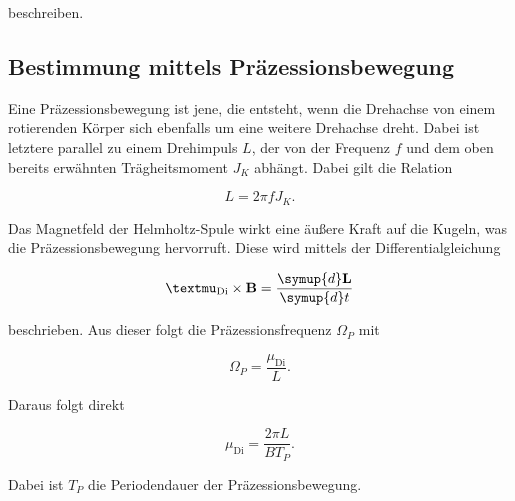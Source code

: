 beschreiben.


\subsection{Bestimmung mittels Präzessionsbewegung}

Eine Präzessionsbewegung ist jene, die entsteht, wenn die Drehachse von einem rotierenden Körper sich ebenfalls um eine weitere Drehachse dreht. 
Dabei ist letztere parallel zu einem Drehimpuls $L$, der von der Frequenz $f$ und dem oben bereits erwähnten Trägheitsmoment $J_K$ abhängt. Dabei gilt die Relation

\begin{equation}
    \label{eqn:drehimpuls}
    L = 2 \pi f J_K.
\end{equation}

Das Magnetfeld der Helmholtz-Spule wirkt eine äußere Kraft auf die Kugeln, was die Präzessionsbewegung hervorruft. Diese wird mittels der Differentialgleichung

\begin{equation}
    \mathbf{µ}_\text{Di} \times \mathbf{B} = \frac{\symup{d}\mathbf{L}}{\symup{d}t}
\end{equation}

beschrieben. Aus dieser folgt die Präzessionsfrequenz $\Omega_P$ mit

\begin{equation}
    \label{eqn:praez-freq}
    \Omega_P = \frac{\mu_\text{Di}}{L}.
\end{equation}

Daraus folgt direkt

\begin{equation}
    \label{eqn:magn-praez}
    \mu_\text{Di} = \frac{2 \pi L}{B T_P}.
\end{equation}

Dabei ist $T_P$ die Periodendauer der Präzessionsbewegung.